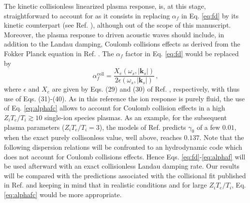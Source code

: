 \documentclass[
 reprint,
 amsmath,amssymb,
 aps,
]{revtex4-1}
\begin{document}
The kinetic collisionless linearized plasma response, is, at this stage,  straightforward to account for as it consists in replacing  $\alpha_f $ in Eq. \eqref{eq:fd} by its kinetic counterpart (see  Ref. \cite[]{POP_Ruyer_2021}), although out of the scope of this manuscript. 
Moreover,   the plasma response to driven acoustic waves should include, in addition to the Landau damping, Coulomb collisions effects as derived from the Fokker Planck equation in Ref. \cite[]{POP_Berger_2005}. The  $\alpha_f $ factor in Eq. \eqref{eq:fd}  would be replaced by 
\begin{equation}
    \alpha_f^\mathrm{coll} = \frac{
    X_e(\omega_s,\vert \mathbf{k}_s\vert )}{2\epsilon(\omega_s,\vert \mathbf{k}_s\vert  )} \, , \label{eq:alphafc}
\end{equation}
where $\epsilon$ and $X_e$ are given by Eqs. (29) and (30) of Ref. \cite[]{POP_Berger_2005}, respectively,  with thus use of Eqs. (31)-(40).
As in this reference the ion response is purely fluid, the use of Eq. \eqref{eq:alphafc} allows to account for Coulomb collision effects in a high $Z_iT_e/T_i\gtrsim 10$ single-ion species plasmas. As an example, for the subsequent plasma parameters ($Z_iT_e/T_i=3$), the models of Ref. \cite[]{POP_Berger_2005} predicts $\gamma_0$ of a few $0.01$, when the exact purely collisonless value, well above, reaches $0.137$. 
Note that the following dispersion relations  will be confronted to an hydrodynamic code  which does not account for Coulomb collisions effects. 
Hence Eqs. \eqref{eq:fd}-\eqref{eq:alphaf} will be used afterward with an exact collisionless Landau damping rate. Our results will be compared with the predictions associated with the collisional fit  published in Ref.  \cite[]{casanova_1989}
and keeping in mind that in realistic conditions and for large $Z_iT_e/T_i$, Eq. \eqref{eq:alphafc} would be  more appropriate. 
\end{document}
